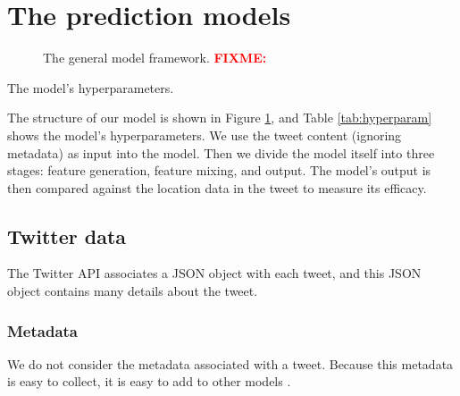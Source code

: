 \documentclass[sigconf,10pt]{acmart}
\newcommand{\fixme}[1]{\textcolor{red}{\textbf{FIXME:} {#1}}}
\begin{document}
\section{The prediction models}

\begin{figure}
    \centering
    
    \caption{The general model framework. \fixme{}}
    \label{fig:model}
\end{figure}

\begin{table}
    \centering
    
    \caption{The model's hyperparameters.}
    \label{tab:hyperparam}
\end{table}

The structure of our model is shown in Figure \ref{fig:model},
and Table \ref{tab:hyperparam} shows the model's hyperparameters. 
We use the tweet content (ignoring metadata) as input into the model.
Then we divide the model itself into three stages:
feature generation, feature mixing, and output.
The model's output is then compared against the location data in the tweet to measure its efficacy.

\subsection{Twitter data}

The Twitter API associates a JSON object with each tweet,
and this JSON object contains many details about the tweet.

\subsubsection{Metadata}

We do not consider the metadata associated with a tweet. 
Because this metadata is easy to collect,
it is easy to add to other models \citep{han2014text}.
\end{document}
